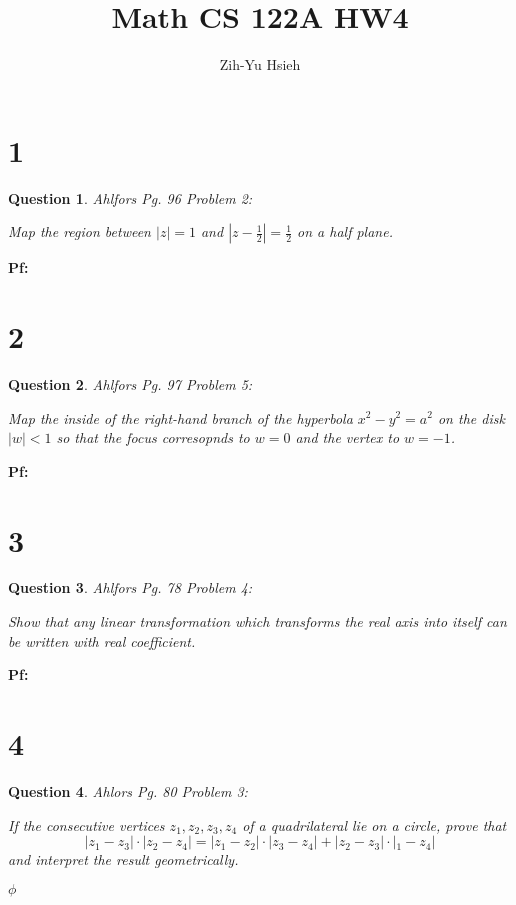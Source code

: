 \documentclass{article}
\title{Math CS 122A HW4}
\author{Zih-Yu Hsieh}
\newtheorem{question}{Question}
\begin{document}
\maketitle

\section*{1}
\begin{myBox}[]{}
    \begin{question}
        Ahlfors Pg. 96 Problem 2:

        Map the region between $|z|=1$ and $|z-\frac{1}{2}|=\frac{1}{2}$ on a half plane.
    \end{question}
\end{myBox}

\textbf{Pf:}

\break

\section*{2}
\begin{myBox}[]{}
    \begin{question}
        Ahlfors Pg. 97 Problem 5:

        Map the inside of the right-hand branch of the hyperbola $x^2-y^2=a^2$ on the disk $|w|<1$
        so that the focus corresopnds to $w=0$ and the vertex to $w=-1$.
    \end{question}
\end{myBox}

\textbf{Pf:}

\break

\section*{3}
\begin{myBox}[]{}
    \begin{question}
        Ahlfors Pg. 78 Problem 4:

        Show that any linear transformation which transforms the real axis
        into itself can be written with real coefficient.
    \end{question}
\end{myBox}

\textbf{Pf:}

\break

\section*{4}
\begin{myBox}[]{}
    \begin{question}
        Ahlors Pg. 80 Problem 3:

        If the consecutive vertices $z_1,z_2,z_3,z_4$ of a quadrilateral lie on a circle, prove that
        $$|z_1-z_3|\cdot|z_2-z_4|=|z_1-z_2|\cdot|z_3-z_4|+|z_2-z_3|\cdot|_1-z_4|$$
        and interpret the result geometrically.
    \end{question}
\end{myBox}
$\phi$
\end{document}
